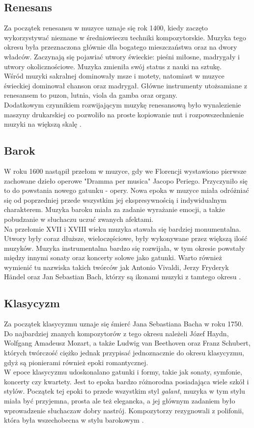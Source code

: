 \documentclass[printmode, eng]{mgr}
\newcommand\tab[1][1cm]{\hspace*{#1}}
\begin{document}
\subsection{Renesans}
\tab Za początek renesansu w muzyce uznaje się rok 1400, kiedy zaczęto wykorzystywać nieznane w średniowieczu techniki kompozytorskie. Muzyka tego okresu była przeznaczona głównie dla bogatego mieszczaństwa oraz na dwory władców. Zaczynają się pojawiać utwory świeckie: pieśni miłosne, madrygały i utwory okolicznościowe. Muzyka zmieniła swój status z nauki na sztukę. \\
\tab Wśród muzyki sakralnej dominowały msze i motety, natomiast w muzyce świeckiej dominował chanson oraz madrygał. Główne instrumenty utożsamiane z renesansem to puzon, lutnia, viola da gamba oraz organy. \\
\tab Dodatkowym czynnikiem rozwijającym muzykę renesansową było wynalezienie maszyny drukarskiej co pozwoliło na proste kopiowanie nut i rozpowszechnienie muzyki na większą skalę \cite{ren}.  
\subsection{Barok}
\tab W roku 1600 nastąpił przełom w muzyce, gdy we Florencji wystawiono pierwsze zachowane dzieło operowe "Dramma per musica" Jacopo Periego. Przyczyniło się to do powstania nowego gatunku - opery. Nowa epoka w muzyce miała odróżniać się od  poprzedniej przede wszystkim jej ekspresywnością i indywidualnym charakterem. Muzyka baroku miała za zadanie wyrażanie emocji, a także pobudzanie w słuchaczu uczuć zwanych afektami.\\
\tab Na przełomie XVII i XVIII wieku muzyka stawała się bardziej monumentalna. Utwory były coraz dłuższe, wieloczęściowe, były wykonywane przez większą ilość muzyków. Muzyka instrumentalna bardzo się rozwijała, w tym okresie powstały między innymi sonaty oraz koncerty solowe jako gatunki. Warto również wymienić tu nazwiska takich twórców jak Antonio Vivaldi, Jerzy Fryderyk Händel oraz Jan Sebastian Bach, którzy są ikonami muzyki z tamtego okresu \cite{bar}. \\
\subsection{Klasycyzm}
\tab Za początek klasycyzmu uznaje się śmierć Jana Sebastiana Bacha w roku 1750. Do najbardziej znanych kompozytorów z tego okresu należeli Józef Haydn, Wolfgang Amadeusz Mozart, a także Ludwig van Beethoven oraz Franz Schubert, których twórczość ciężko jednak przypisać jednoznacznie do okresu klasycyzmu, gdyż są pionierami również epoki romantycznej.\\
\tab W epoce klasycyzmu udoskonalano gatunki i formy, takie jak sonaty, symfonie, koncerty czy kwartety. Jest to epoka bardzo różnorodna posiadająca wiele szkół i stylów. Początek tej epoki to przede wszystkim styl \textit{galant}, muzyka w tym stylu miała być przyjemna, prosta ale też elegancka, a jej głównym zadaniem było wprowadzenie słuchacza\linebreak w dobry nastrój. Kompozytorzy rezygnowali z polifonii, która była wszechobecna w stylu barokowym \cite{clas}. 
\end{document}
